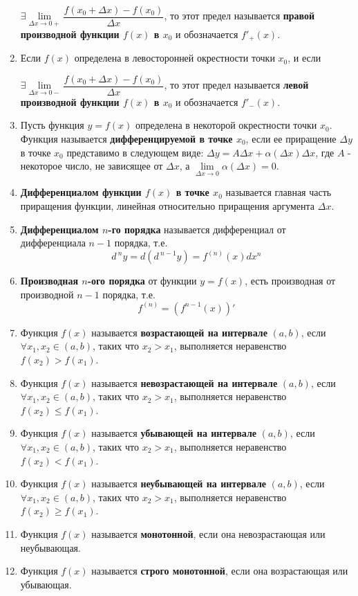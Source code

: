 \begin{enumerate}
$\exists \lim\limits_{\Delta x \to 0+}{\dfrac{f(x_0+\Delta x) - f(x_0)}{\Delta x}}$, то этот предел называется \textbf{правой производной функции $f(x)$ в $x_0$} и обозначается $f'_+(x)$.
\item Если $f(x)$ определена в левосторонней окрестности точки $x_0$, и если

$\exists \lim\limits_{\Delta x \to 0-}{\dfrac{f(x_0+\Delta x) - f(x_0)}{\Delta x}}$, то этот предел называется \textbf{левой производной функции $f(x)$ в $x_0$} и обозначается $f'_-(x)$.
\item Пусть функция $y = f(x)$ определена в некоторой окрестности точки $x_0$. Функция называется \textbf{дифференцируемой в точке $x_0$}, если ее приращение $\Delta y$ в точке $x_0$ представимо в следующем виде: $\Delta y = A\Delta x + \alpha(\Delta x)\Delta x$, где $A$ - некоторое число, не зависящее от $\Delta x$, а $\lim\limits_{\Delta x \to 0}\alpha(\Delta x) = 0$.
\item \textbf{Дифференциалом функции $f(x)$ в точке $x_0$} называется главная часть приращения функции, линейная относительно приращения аргумента $\Delta x$.
\item \textbf{Дифференциалом $n$-го порядка} называется дифференциал от дифференциала $n-1$ порядка, т.е. $$d^{\ n}y = d(d^{\ n-1}y) = f^{(n)}(x)dx^n$$
\item \textbf{Производная $n$-ого порядка} от функции $y = f(x)$, есть производная от производной $n-1$ порядка, т.е. $$f^{(n)} = (f^{n-1}(x))'$$
\item Функция $f(x)$ называется \textbf{возрастающей на интервале} $(a, b)$, если $\forall x_1, x_2 \in (a, b)$, таких что $x_2 > x_1$, выполняется неравенство $f(x_2)>f(x_1)$.
\item Функция $f(x)$ называется \textbf{невозрастающей на интервале} $(a, b)$, если $\forall x_1, x_2 \in (a, b)$, таких что $x_2 > x_1$, выполняется неравенство $f(x_2)\leqslant f(x_1)$.
\item Функция $f(x)$ называется \textbf{убывающей на интервале} $(a, b)$, если $\forall x_1, x_2 \in (a, b)$, таких что $x_2 > x_1$, выполняется неравенство $f(x_2)<f(x_1)$.
\item Функция $f(x)$ называется \textbf{неубывающей на интервале} $(a, b)$, если $\forall x_1, x_2 \in (a, b)$, таких что $x_2 > x_1$, выполняется неравенство $f(x_2)\geqslant f(x_1)$.
\item Функция $f(x)$ называется \textbf{монотонной}, если она невозрастающая или неубывающая.
\item Функция $f(x)$ называется \textbf{строго монотонной}, если она возрастающая или убывающая.

\end{enumerate}
